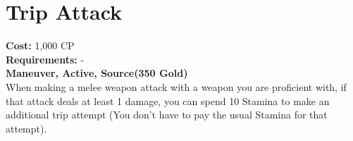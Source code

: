\section{Trip Attack}\label{maneuver:tripAttack}
\textbf{Cost:} 1,000 CP\\
\textbf{Requirements:} -\\
\textbf{Maneuver, Active, Source(350 Gold)}\\
When making a melee weapon attack with a weapon you are proficient with, if that attack deals at least 1 damage, you can spend 10 Stamina to make an additional trip attempt (You don't have to pay the usual Stamina for that attempt).\\
